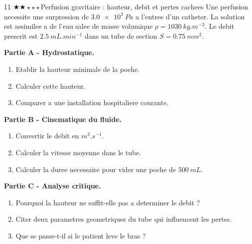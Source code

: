 \documentclass[11pt,a4paper]{article}
\newcommand{\difftwo}{\(\bigstar\bigstar\star\star\star\)}
\begin{document}
\begin{probleme}{11 \difftwo}{Perfusion gravitaire : hauteur, debit et pertes cachees}
Une perfusion necessite une surpression de \(\SI{3.0e3}{Pa}\) a l'entree d'un catheter. La solution est assimilee a de l'eau salee de masse volumique \(\rho=\SI{1030}{kg.m^{-3}}\). Le debit prescrit est \(\SI{2.5}{mL.min^{-1}}\) dans un tube de section \(S=\SI{0.75}{mm^2}\).

\textbf{Partie A - Hydrostatique.}
\begin{enumerate}
\item Etablir la hauteur minimale de la poche.
\item Calculer cette hauteur.
\item Comparer a une installation hospitaliere courante.
\end{enumerate}

\textbf{Partie B - Cinematique du fluide.}
\begin{enumerate}[resume]
\item Convertir le debit en \(\si{m^3.s^{-1}}\).
\item Calculer la vitesse moyenne dans le tube.
\item Calculer la duree necessaire pour vider une poche de \(\SI{500}{mL}\).
\end{enumerate}

\textbf{Partie C - Analyse critique.}
\begin{enumerate}[resume]
\item Pourquoi la hauteur ne suffit-elle pas a determiner le debit ?
\item Citer deux parametres geometriques du tube qui influencent les pertes.
\item Que se passe-t-il si le patient leve le bras ?
\end{enumerate}
\end{probleme}
\end{document}
